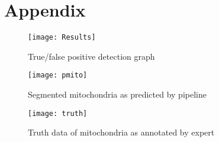 \documentclass[11pt]{article} %
\begin{document}
\section{Appendix}

\begin{figure}[!htb]
  \texttt{[image: Results]}
  \caption{True/false positive detection graph}\label{fig:awesome_image1}
\endminipage\hfill
{}
  \texttt{[image: pmito]}
  \caption{Segmented mitochondria as predicted by pipeline}\label{fig:awesome_image2}
\endminipage\hfill
{}%
  \texttt{[image: truth]}
  \caption{Truth data of mitochondria as annotated by expert}\label{fig:awesome_image3}
\endminipage
\end{figure}
\end{document}
